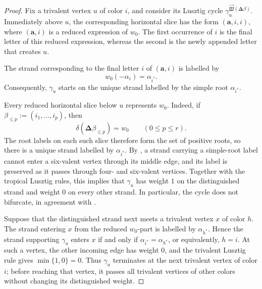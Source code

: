 \documentclass[12pt, reqno]{amsart}
\theoremstyle{plain}
\theoremstyle{definition}
\numberwithin{equation}{section}
\begin{document}
\begin{proof}
Fix a trivalent vertex \(u\) of color \(i\), and consider its
Lusztig cycle
\(\gamma_u^{\overrightarrow{\mathfrak W}
(\boldsymbol{\Delta}\beta)}\). Immediately above \(u\), the
corresponding horizontal slice has the form \((\mathbf a,i,i)\),
where \((\mathbf a,i)\) is a reduced expression of \(w_0\). The
first occurrence of \(i\) is the final letter of this reduced
expression, whereas the second is the newly appended letter that
creates \(u\).

The strand corresponding to the final letter \(i\) of
\((\mathbf a,i)\) is labelled by
\begin{equation}\label{eq:simple-root-label-at-u}
    w_0(-\alpha_i)=\alpha_{i^*}.
\end{equation}
Consequently, \(\gamma_u\) starts on the unique strand labelled by
the simple root \(\alpha_{i^*}\).

Every reduced horizontal slice below \(u\) represents \(w_0\).
Indeed, if \(\beta_{\leq p}:=(i_1,\ldots,i_p)\), then
\begin{equation}\label{eq:Demazure-product-after-Delta}
    \delta(\boldsymbol{\Delta}\beta_{\leq p})=w_0
    \qquad(0\leq p\leq r).
\end{equation}
The root labels on each such slice therefore form the set of positive
roots, so there is a unique strand labelled by
\(\alpha_{i^*}\). By
\cite[Lemma~4.39]{casals2025cluster}, a strand carrying a simple-root
label cannot enter a six-valent vertex through its middle edge, and
its label is preserved as it passes through four- and six-valent
vertices. Together with the tropical Lusztig rules, this implies that
\(\gamma_u\) has weight \(1\) on the distinguished strand and
weight \(0\) on every other strand. In particular, the cycle does
not bifurcate, in agreement with
\cite[Lemma~4.42]{casals2025cluster}.

Suppose that the distinguished strand next meets a trivalent vertex
\(x\) of color \(h\). The strand entering \(x\) from the reduced
\(w_0\)-part is labelled by \(\alpha_{h^*}\). Hence the strand
supporting \(\gamma_u\) enters \(x\) if and only if
\(\alpha_{i^*}=\alpha_{h^*}\), or equivalently, \(h=i\). At such a
vertex, the other incoming edge has weight \(0\), and the trivalent
Lusztig rule gives \(\min\{1,0\}=0\). Thus \(\gamma_u\) terminates
at the next trivalent vertex of color \(i\); before reaching that
vertex, it passes all trivalent vertices of other colors without
changing its distinguished weight.


\end{proof}
\end{document}
